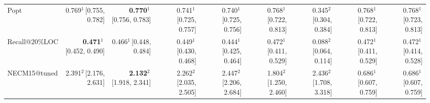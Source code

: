 \begin{tabular}{lrrrrrrrr}
Popt & 0.769$^{1}$\,{\scriptsize[0.755, 0.782]} & \textbf{0.770$^{1}$}\,{\scriptsize[0.756, 0.783]} & 0.741$^{1}$\,{\scriptsize[0.725, 0.757]} & 0.740$^{1}$\,{\scriptsize[0.725, 0.756]} & 0.768$^{1}$\,{\scriptsize[0.722, 0.813]} & 0.345$^{2}$\,{\scriptsize[0.304, 0.384]} & 0.768$^{1}$\,{\scriptsize[0.722, 0.813]} & 0.768$^{1}$\,{\scriptsize[0.723, 0.813]} \\
Recall@20\%LOC & \textbf{0.471$^{1}$}\,{\scriptsize[0.452, 0.490]} & 0.466$^{1}$\,{\scriptsize[0.448, 0.484]} & 0.449$^{1}$\,{\scriptsize[0.430, 0.468]} & 0.444$^{1}$\,{\scriptsize[0.425, 0.464]} & 0.472$^{1}$\,{\scriptsize[0.411, 0.529]} & 0.088$^{2}$\,{\scriptsize[0.064, 0.114]} & 0.472$^{1}$\,{\scriptsize[0.411, 0.529]} & 0.472$^{1}$\,{\scriptsize[0.414, 0.528]} \\
NECM15@tuned & 2.391$^{2}$\,{\scriptsize[2.176, 2.631]} & \textbf{2.132$^{2}$}\,{\scriptsize[1.918, 2.341]} & 2.262$^{2}$\,{\scriptsize[2.035, 2.505]} & 2.447$^{2}$\,{\scriptsize[2.206, 2.684]} & 1.804$^{2}$\,{\scriptsize[1.250, 2.460]} & 2.436$^{2}$\,{\scriptsize[1.708, 3.318]} & 0.686$^{1}$\,{\scriptsize[0.607, 0.759]} & 0.686$^{1}$\,{\scriptsize[0.607, 0.759]} \\
\bottomrule
\end{tabular}
